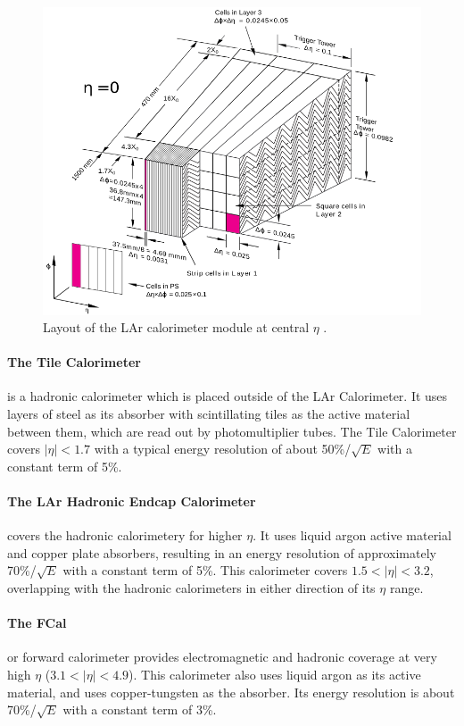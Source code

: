 \begin{centering}
\begin{figure}[!htb]
\myfloatalign
\includegraphics[width=.90\linewidth]{figures/atlas/LARG3-TDR-barrelM_samplings_presamp_new.png}
\caption{Layout of the LAr calorimeter module at central $\eta$ \cite{PERF-2007-01}.}
\label{fig:calo_mod}
\end{figure}
\end{centering}

\paragraph{The Tile Calorimeter} is a hadronic calorimeter which is placed outside of the LAr Calorimeter. It uses layers of steel as its absorber with scintillating tiles as the active material between them, which are read out by photomultiplier tubes. The Tile Calorimeter covers $|\eta| < 1.7$ with a typical energy resolution of about 50\%/$\sqrt{E}$ with a constant term of 5\%. 

\paragraph{The LAr Hadronic Endcap Calorimeter} covers the hadronic calorimetery for higher $\eta$. It uses liquid argon active material and copper plate absorbers, resulting in an energy resolution of approximately 70\%/$\sqrt{E}$ with a constant term of 5\%. This calorimeter covers $1.5 < |\eta| < 3.2$, overlapping with the hadronic calorimeters in either direction of its $\eta$ range. 

\paragraph{The FCal} or forward calorimeter provides electromagnetic and hadronic coverage at very high $\eta$ ($3.1 < |\eta| < 4.9$). This calorimeter also uses liquid argon as its active material, and uses copper-tungsten as the absorber. Its energy resolution is about 70\%/$\sqrt{E}$ with a constant term of 3\%.

